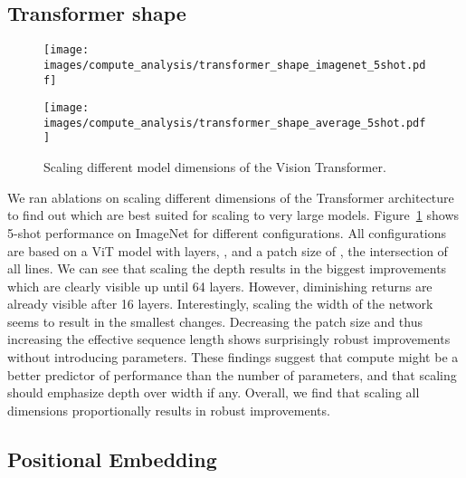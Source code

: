 \documentclass{article} \usepackage{iclr2021_conference,times}
\newcommand{\oursabbrv}{ViT\xspace}
\newcommand{\oursfull}{Vision Transformer\xspace}
\newcommand{\imagenet}{ImageNet\xspace}
\begin{document}
\subsection{Transformer shape}
\begin{figure}

\begin{minipage}[t]{0.47\textwidth}
\begin{center}
\texttt{[image: images/compute\_analysis/transformer\_shape\_imagenet\_5shot.pdf]}
\end{center}
\end{minipage}\quad
\begin{minipage}[t]{0.47\textwidth}
\begin{center}
\texttt{[image: images/compute\_analysis/transformer\_shape\_average\_5shot.pdf]}
\end{center}
\label{fig:scaling_transformers_average}
\end{minipage}
\caption{Scaling different model dimensions of the \oursfull.}
\label{fig:scaling_transformers}
\end{figure}

We ran ablations on scaling different dimensions of the Transformer architecture to find out which are best suited for scaling to very large models. Figure~\ref{fig:scaling_transformers} shows 5-shot performance on \imagenet for different configurations. All configurations are based on a \oursabbrv model with  layers, ,  and a patch size of , the intersection of all lines. We can see that scaling the depth results in the biggest improvements which are clearly visible up until 64 layers. However, diminishing returns are already visible after 16 layers. Interestingly, scaling the width of the network seems to result in the smallest changes. Decreasing the patch size and thus increasing the effective sequence length shows surprisingly robust improvements without introducing parameters. These findings suggest that compute might be a better predictor of performance than the number of parameters, and that scaling should emphasize depth over width if any. Overall, we find that scaling all dimensions proportionally results in robust improvements.





\subsection{Positional Embedding}
\label{app:pos_emb}
\end{document}
